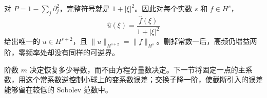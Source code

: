 \begin{example}\label{g3:exm:laplace-frequency-gain}
	对 \(P=1-\sum_j\partial_j^2\)，完整符号就是 \(1+|\xi|^2\)。因此对每个实数 \(s\) 和 \(f\in H^s\)，
	\[
		\widehat u(\xi)=\frac{\widehat f(\xi)}{1+|\xi|^2}
	\]
	给出唯一的 \(u\in H^{s+2}\)，且 \(\|u\|_{H^{s+2}}=\|f\|_{H^s}\)。删掉常数一后，高频仍增益两阶，零频率处却没有同样的可逆界。
\end{example}

阶数 \(m\) 决定恢复多少导数，而不由方程分量数决定。下一节将固定一点的主系数，用这个常系数逆控制小球上的变系数误差；交换子降一阶，使截断引入的误差能够留在较低的 Sobolev 范数中。

